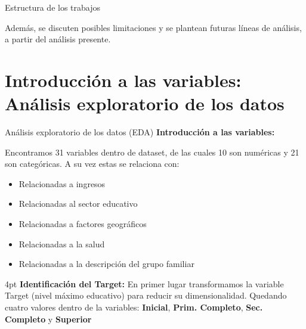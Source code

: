 \documentclass[pdf]{beamer}
\def\vspace{}%
\begin{document}
{\begin{frame}{Estructura de los trabajos}
\begin{enumerate}
        Además, se discuten posibles limitaciones y se plantean futuras líneas de análisis, a partir del análisis presente.

    \end{enumerate}

\end{frame}

\section{Introducción a las variables: Análisis exploratorio de los datos}

\begin{frame}{Análisis exploratorio de los datos (EDA)}
\textbf{Introducción a las variables:}

Encontramos 31 variables dentro de dataset, de las cuales 10 son numéricas y 21 son categóricas. A su vez estas se relaciona con:
\begin{itemize} 
    \item Relacionadas a ingresos
    \item Relacionadas al sector educativo
    \item Relacionadas a factores geográficos
    \item Relacionadas a la salud
    \item Relacionadas a la descripción del grupo familiar
\end{itemize}
 \vspace{4pt}
 \textbf{Identificación del Target:} En primer lugar transformamos la variable Target (nivel máximo educativo) para reducir su dimensionalidad. Quedando cuatro valores dentro de la variables:  \textbf{Inicial}, \textbf{Prim. Completo}, \textbf{Sec. Completo} y \textbf{Superior}
\end{frame}
 
}
\end{document}
